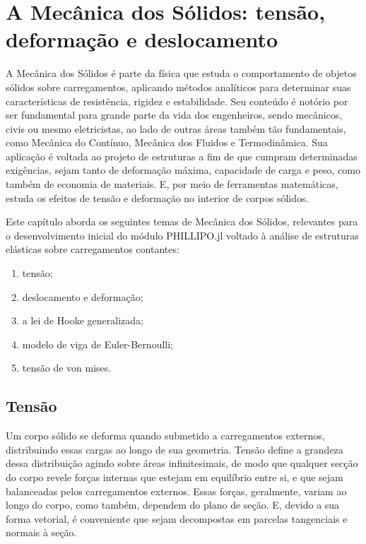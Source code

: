 \chapter{A Mecânica dos Sólidos: tensão, deformação e deslocamento}

A Mecânica dos Sólidos é parte da física que estuda o comportamento de objetos sólidos sobre carregamentos, aplicando métodos analíticos para determinar suas características de resistência, rigidez e estabilidade. Seu conteúdo é notório por ser fundamental para grande parte da vida dos engenheiros, sendo mecânicos, civis ou mesmo eletricistas, ao lado de outras áreas também tão fundamentais, como Mecânica do Contínuo, Mecânica dos Fluidos e Termodinâmica. Sua aplicação é voltada ao projeto de estruturas a fim de que cumpram determinadas exigências, sejam tanto de deformação máxima, capacidade de carga e peso, como também de economia de materiais. E, por meio de ferramentas matemáticas, estuda os efeitos de tensão e deformação no interior de corpos sólidos. \cite{popov}

Este capítulo aborda os seguintes temas de Mecânica dos Sólidos, relevantes para o desenvolvimento inicial do módulo PHILLIPO.jl voltado à análise de estruturas elásticas sobre carregamentos contantes:
\begin{enumerate}
    \item tensão;
    \item deslocamento e deformação;
    \item a lei de Hooke generalizada;
    \item modelo de viga de Euler-Bernoulli;
    \item tensão de von mises.
\end{enumerate}

\section{Tensão}

Um corpo sólido se deforma quando submetido a carregamentos externos, distribuindo essas cargas ao longo de sua geometria. Tensão define a grandeza dessa distribuição agindo sobre áreas infinitesimais, de modo que qualquer secção do corpo revele forças internas que estejam em equilíbrio entre si, e que sejam balanceadas pelos carregamentos externos. Essas forças, geralmente, variam ao longo do corpo, como também, dependem do plano de seção. E, devido a sua forma vetorial, é conveniente que sejam decompostas em parcelas tangenciais e normais à seção. \cite{popov}

